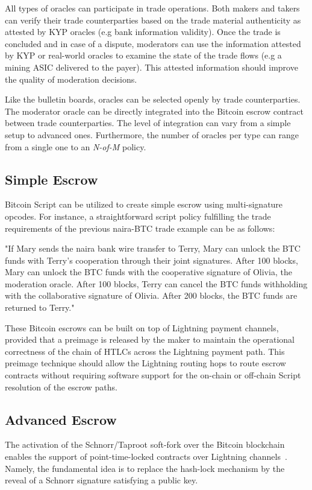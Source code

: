 \documentclass[pdflatex,sn-mathphys]{sn-jnl}%
\theoremstyle{thmstyleone}%
\theoremstyle{thmstyletwo}%
\theoremstyle{thmstylethree}%
\begin{document}
All types of oracles can participate in trade operations. Both makers and takers can verify their trade counterparties based on the trade material authenticity as attested by KYP oracles (e.g bank information validity). Once the trade is concluded and in case of a dispute, moderators can use the information attested by KYP or real-world oracles to examine the state of the trade flows (e.g a mining ASIC delivered to the payer). This attested information should improve the quality of moderation decisions.

Like the bulletin boards, oracles can be selected openly by trade counterparties. The moderator oracle can be directly integrated into the Bitcoin escrow contract between trade counterparties. The level of integration can vary from a simple setup to advanced ones. Furthermore, the number of oracles per type can range from a single one to an \textit{N-of-M} policy.

\subsection{Simple Escrow}

Bitcoin Script can be utilized to create simple escrow using multi-signature opcodes. For instance, a straightforward script policy fulfilling the trade requirements of the previous naira-BTC trade example can be as follows:

"If Mary sends the naira bank wire transfer to Terry, Mary can unlock the BTC funds with Terry's cooperation through their joint signatures. After 100 blocks, Mary can unlock the BTC funds with the cooperative signature of Olivia, the moderation oracle. After 100 blocks, Terry can cancel the BTC funds withholding with the collaborative signature of Olivia. After 200 blocks, the BTC funds are returned to Terry."

These Bitcoin escrows can be built on top of Lightning payment channels, provided that a preimage is released by the maker to maintain the operational correctness of the chain of HTLCs across the Lightning payment path. This preimage technique should allow the Lightning routing hops to route escrow contracts without requiring software support for the on-chain or off-chain Script resolution of the escrow paths.

\subsection{Advanced Escrow}

The activation of the Schnorr/Taproot soft-fork over the Bitcoin blockchain enables the support of point-time-locked contracts over Lightning channels~\cite{PTLC2023Optech}. Namely, the fundamental idea is to replace the hash-lock mechanism by the reveal of a Schnorr signature satisfying a public key.
\end{document}
